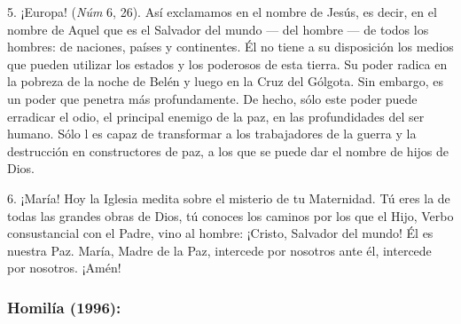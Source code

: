\begin{body}
	5. ¡Europa!  (\emph{Núm} 6, 26). Así exclamamos en el nombre de Jesús, es decir, en el nombre de Aquel que es el Salvador del mundo --- del hombre --- de todos los hombres: de naciones, países y continentes. Él no tiene a su disposición los medios que pueden utilizar los estados y los poderosos de esta tierra. Su poder radica en la pobreza de la noche de Belén y luego en la Cruz del Gólgota. Sin embargo, es un poder que penetra más profundamente. De hecho, sólo este poder puede erradicar el odio, el principal enemigo de la paz, en las profundidades del ser humano. Sólo l es capaz de transformar a los trabajadores de la guerra y la destrucción en constructores de paz, a los que se puede dar el nombre de hijos de Dios.
	
	6. ¡María! Hoy la Iglesia medita sobre el misterio de tu Maternidad. Tú eres la  de todas las grandes obras de Dios, tú conoces los caminos por los que el Hijo, Verbo consustancial con el Padre, vino al hombre: ¡Cristo, Salvador del mundo! Él es nuestra Paz. María, Madre de la Paz, intercede por nosotros ante él, intercede por nosotros. ¡Amén!
\end{body}


\subsubsection{Homilía (1996):}


